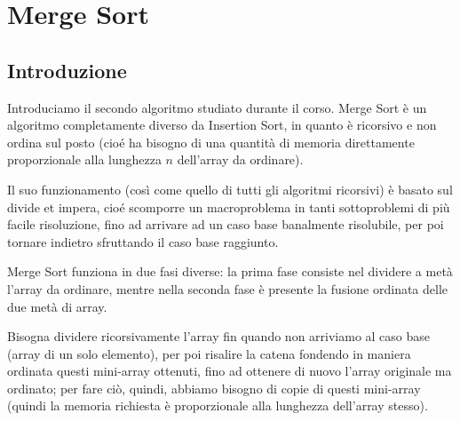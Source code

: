 \chapter{Merge Sort}

\section{Introduzione}
Introduciamo il secondo algoritmo studiato durante il corso. Merge Sort è un algoritmo completamente diverso da Insertion Sort, in quanto è ricorsivo e non ordina sul posto (cioé ha bisogno di una quantità di memoria direttamente proporzionale alla lunghezza $n$ dell'array da ordinare). 

Il suo funzionamento (così come quello di tutti gli algoritmi ricorsivi) è basato sul divide et impera, cioé scomporre un macroproblema in tanti sottoproblemi di più facile risoluzione, fino ad arrivare ad un caso base banalmente risolubile, per poi tornare indietro sfruttando il caso base raggiunto.

Merge Sort funziona in due fasi diverse: la prima fase consiste nel dividere a metà l'array da ordinare, mentre nella seconda fase è presente la fusione ordinata delle due metà di array.

Bisogna dividere ricorsivamente l'array fin quando non arriviamo al caso base (array di un solo elemento), per poi risalire la catena fondendo in maniera ordinata questi mini-array ottenuti, fino ad ottenere di nuovo l'array originale ma ordinato; per fare ciò, quindi, abbiamo bisogno di copie di questi mini-array (quindi la memoria richiesta è proporzionale alla lunghezza dell'array stesso).

